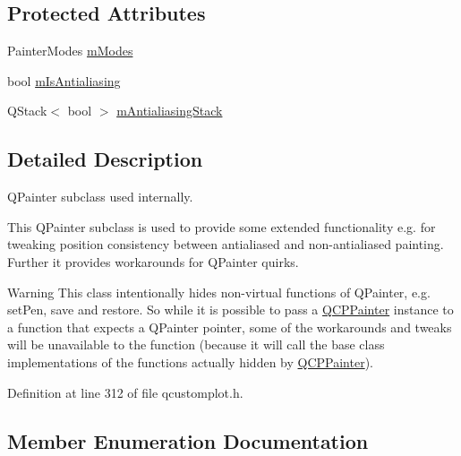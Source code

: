 \subsection*{Protected Attributes}
\begin{DoxyCompactItemize}
\item 
Painter\+Modes \hyperlink{class_q_c_p_painter_af5d1d6e5df0adbc7de5633250fb3396c}{m\+Modes}
\item 
bool \hyperlink{class_q_c_p_painter_a7055085da176aee0f6b23298f1003d08}{m\+Is\+Antialiasing}
\item 
Q\+Stack$<$ bool $>$ \hyperlink{class_q_c_p_painter_a0189e641bbf7dc31ac15aef7b36501fa}{m\+Antialiasing\+Stack}
\end{DoxyCompactItemize}


\subsection{Detailed Description}
Q\+Painter subclass used internally. 

This Q\+Painter subclass is used to provide some extended functionality e.\+g. for tweaking position consistency between antialiased and non-\/antialiased painting. Further it provides workarounds for Q\+Painter quirks.

\begin{DoxyWarning}{Warning}
This class intentionally hides non-\/virtual functions of Q\+Painter, e.\+g. set\+Pen, save and restore. So while it is possible to pass a \hyperlink{class_q_c_p_painter}{Q\+C\+P\+Painter} instance to a function that expects a Q\+Painter pointer, some of the workarounds and tweaks will be unavailable to the function (because it will call the base class implementations of the functions actually hidden by \hyperlink{class_q_c_p_painter}{Q\+C\+P\+Painter}). 
\end{DoxyWarning}


Definition at line 312 of file qcustomplot.\+h.



\subsection{Member Enumeration Documentation}
\hypertarget{class_q_c_p_painter_a156cf16444ff5e0d81a73c615fdb156d}{}
